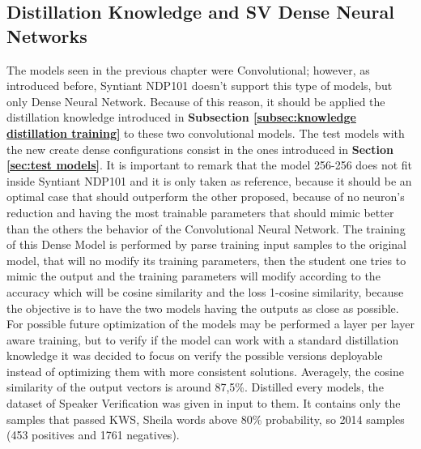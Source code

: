 \subsection{Distillation Knowledge and SV Dense Neural Networks}
\label{sec:distillation knowledge and sv dense neural networks}
The models seen in the previous chapter were Convolutional; however, as introduced before, Syntiant NDP101 doesn't support this type of models, but only Dense Neural Network. Because of this reason, it should be applied the distillation knowledge introduced in \textbf{Subsection \ref{subsec:knowledge distillation training}} to these two convolutional models. The test models with the new create dense configurations consist in the ones introduced in \textbf{Section \ref{sec:test models}}. It is important to remark that the model 256-256 does not fit inside Syntiant NDP101 and it is only taken as reference, because it should be an optimal case that should outperform the other proposed, because of no neuron's reduction and having the most trainable parameters that should mimic better than the others the behavior of the Convolutional Neural Network. 
The training of this Dense Model is performed by parse training input samples to the original model, that will no modify its training parameters, then the student one tries to mimic the output and the training parameters will modify according to the accuracy which will be cosine similarity and the loss 1-cosine similarity, because the objective is to have the two models having the outputs as close as possible. For possible future optimization of the models may be performed a layer per layer aware training, but to verify if the model can work with a standard distillation knowledge it was decided to focus on verify the possible versions deployable instead of optimizing them with more consistent solutions. Averagely, the cosine similarity of the output vectors is around 87,5\%. Distilled every models, the dataset of Speaker Verification was given in input to them. It contains only the samples that passed KWS, Sheila words above 80\% probability, so 2014 samples (453 positives and 1761 negatives). 
